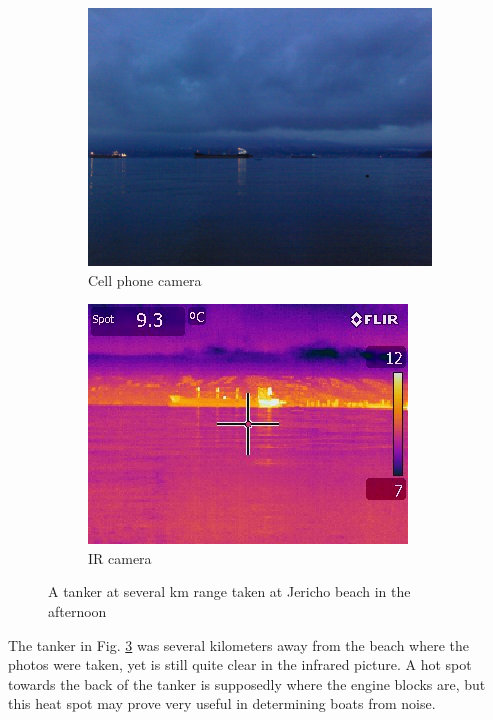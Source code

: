 \begin{figure}[H]
\centering
\begin{subfigure}{.5\textwidth}
  \centering
  \includegraphics[width=.8\linewidth]{"./image/jericho-evening-tanker-visible"}
  \caption{Cell phone camera}
  \label{fig:sub1}
\end{subfigure}%
\begin{subfigure}{.5\textwidth}
  \centering
  \includegraphics[width=.8\linewidth]{"./image/jericho-evening-tanker-ir"}
  \caption{IR camera}
  \label{fig:sub2}
\end{subfigure}
\caption{A tanker at several km range taken at Jericho beach in the afternoon}
\label{fig:IR comparison of a tanker in the afternoon}
\end{figure}
 
The tanker in Fig. \ref{fig:IR comparison of a tanker in the afternoon} was several kilometers away from the beach where the photos were taken, yet is still quite clear in the infrared picture. A hot spot towards the back of the tanker is supposedly where the engine blocks are, but this heat spot may prove very useful in determining boats from noise.


